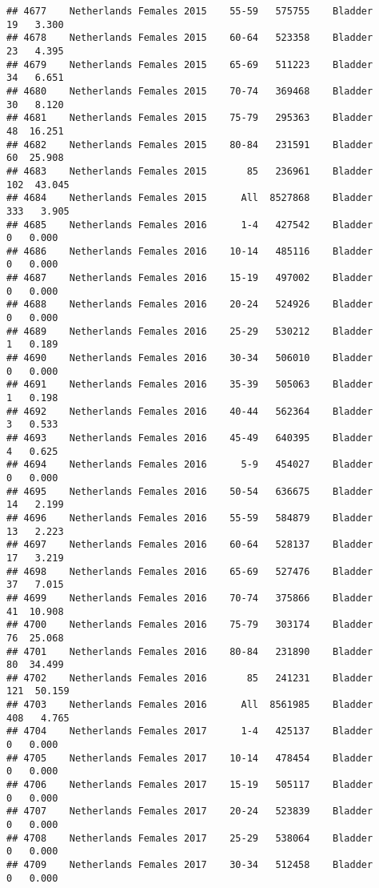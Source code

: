 \documentclass[
]{article}
\begin{document}
\begin{verbatim}
## 4677    Netherlands Females 2015    55-59   575755    Bladder     19   3.300
## 4678    Netherlands Females 2015    60-64   523358    Bladder     23   4.395
## 4679    Netherlands Females 2015    65-69   511223    Bladder     34   6.651
## 4680    Netherlands Females 2015    70-74   369468    Bladder     30   8.120
## 4681    Netherlands Females 2015    75-79   295363    Bladder     48  16.251
## 4682    Netherlands Females 2015    80-84   231591    Bladder     60  25.908
## 4683    Netherlands Females 2015       85   236961    Bladder    102  43.045
## 4684    Netherlands Females 2015      All  8527868    Bladder    333   3.905
## 4685    Netherlands Females 2016      1-4   427542    Bladder      0   0.000
## 4686    Netherlands Females 2016    10-14   485116    Bladder      0   0.000
## 4687    Netherlands Females 2016    15-19   497002    Bladder      0   0.000
## 4688    Netherlands Females 2016    20-24   524926    Bladder      0   0.000
## 4689    Netherlands Females 2016    25-29   530212    Bladder      1   0.189
## 4690    Netherlands Females 2016    30-34   506010    Bladder      0   0.000
## 4691    Netherlands Females 2016    35-39   505063    Bladder      1   0.198
## 4692    Netherlands Females 2016    40-44   562364    Bladder      3   0.533
## 4693    Netherlands Females 2016    45-49   640395    Bladder      4   0.625
## 4694    Netherlands Females 2016      5-9   454027    Bladder      0   0.000
## 4695    Netherlands Females 2016    50-54   636675    Bladder     14   2.199
## 4696    Netherlands Females 2016    55-59   584879    Bladder     13   2.223
## 4697    Netherlands Females 2016    60-64   528137    Bladder     17   3.219
## 4698    Netherlands Females 2016    65-69   527476    Bladder     37   7.015
## 4699    Netherlands Females 2016    70-74   375866    Bladder     41  10.908
## 4700    Netherlands Females 2016    75-79   303174    Bladder     76  25.068
## 4701    Netherlands Females 2016    80-84   231890    Bladder     80  34.499
## 4702    Netherlands Females 2016       85   241231    Bladder    121  50.159
## 4703    Netherlands Females 2016      All  8561985    Bladder    408   4.765
## 4704    Netherlands Females 2017      1-4   425137    Bladder      0   0.000
## 4705    Netherlands Females 2017    10-14   478454    Bladder      0   0.000
## 4706    Netherlands Females 2017    15-19   505117    Bladder      0   0.000
## 4707    Netherlands Females 2017    20-24   523839    Bladder      0   0.000
## 4708    Netherlands Females 2017    25-29   538064    Bladder      0   0.000
## 4709    Netherlands Females 2017    30-34   512458    Bladder      0   0.000

\end{verbatim}
\end{document}
